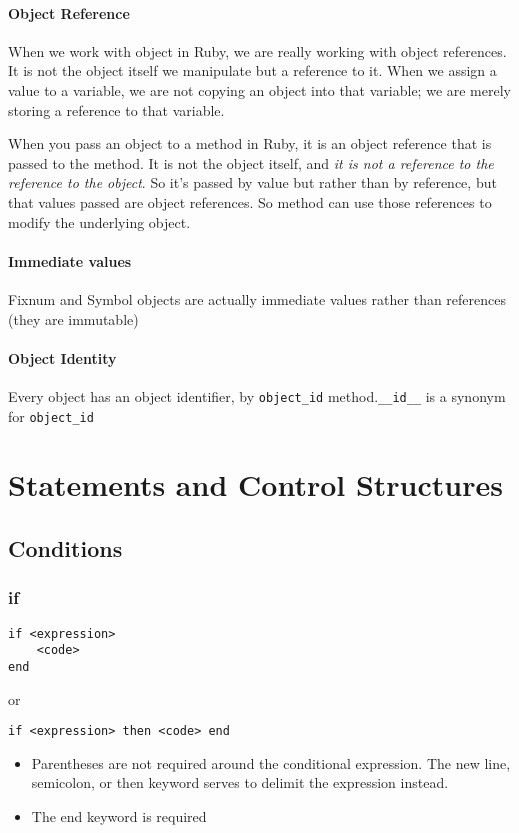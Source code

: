 \documentclass[11pt, a4paper]{book}
\begin{document}
\subsubsection{Object Reference}
When we work with object in Ruby, we are really working with object references.
It is not the object itself we manipulate but a reference to it. When we assign
a value to a variable, we are not copying an object into that variable; we are
merely storing a reference to that variable.

When you pass an object to a method in Ruby, it is an object reference that is
passed to the method. It is not the object itself, and \emph{it is not a
reference to the reference to the object}. So it's passed by value but rather
than by reference, but that values passed are object references. So method can
use those references to modify the underlying object.
\subsubsection{Immediate values}
Fixnum and Symbol objects are actually immediate values rather than references
(they are immutable)

\subsubsection{Object Identity}
Every object has an object identifier, by \verb|object_id| method.\verb|__id__|
is a synonym for \verb|object_id|

\chapter{Statements and Control Structures}
\section{Conditions}

\subsection{if}
\begin{verbatim}
if <expression>
    <code>
end
\end{verbatim}
or
\begin{verbatim}
if <expression> then <code> end
\end{verbatim}
\begin{itemize}
    \item Parentheses are not required around the conditional expression. The
    new line, semicolon, or then keyword serves to delimit the expression
    instead.
    \item The end keyword is required
\end{itemize}
\end{document}
